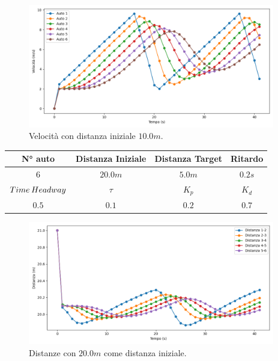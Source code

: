\begin{figure}[H]
    \includegraphics[width=0.96\textwidth]{images/5-experiment/car-spacing/velocity_10.png}
    \caption{Velocità con distanza iniziale $10.0 m$.}
    \label{fig:10-space-velocity}
\end{figure}
\vspace*{\fill}
\newpage
\vspace*{\fill}
\begin{table}[h]
    \centering
    \begin{tabular}{|c|c|c|c|}
        \hline
        N° auto & Distanza Iniziale & Distanza Target & Ritardo \\
        \hline
        $6$ & $20.0 m$ & $5.0 m$ & $0.2 s$ \\
        \hline
        $Time\hspace{0.2em}Headway$ & $\tau$ & $K_p$ & $K_d$  \\
        \hline
        $0.5$ & $0.1$ & $0.2$ & $0.7$ \\
        \hline
    \end{tabular}
\end{table}

\begin{figure}[H]
    \includegraphics[width=0.96\textwidth]{images/5-experiment/car-spacing/distance_20.png}
    \caption{Distanze con $20.0 m$ come distanza iniziale.}
    \label{fig:20-space-distance}
\end{figure}


